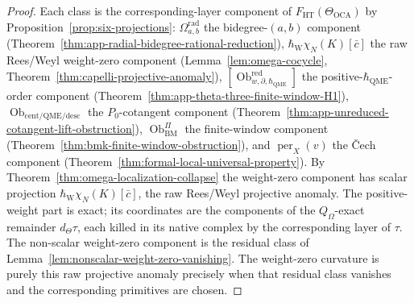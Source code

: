 \begin{proof}
Each class is the corresponding-layer component of
\(F_{\mathrm{HT}}(\Theta_{\mathrm{OCA}})\) by
Proposition~\ref{prop:six-projections}:
\(\Omega^{\mathrm{rad}}_{a,b}\) the bidegree-\((a,b)\) component
(Theorem~\ref{thm:app-radial-bidegree-rational-reduction}),
\(\hbar_{\mathrm{W}}\chi_N(K)[\bar c]\) the raw Rees/Weyl
weight-zero component
(Lemma~\ref{lem:omega-cocycle},
Theorem~\ref{thm:capelli-projective-anomaly}),
\([\operatorname{Ob}^{\mathrm{red}}_{w,\partial,\hbar_{\mathrm{QME}}}]\) the
positive-\(\hbar_{\mathrm{QME}}\)-order component
(Theorem~\ref{thm:app-theta-three-finite-window-H1}),
\(\operatorname{Ob}_{\mathrm{cent/QME/desc}}\) the \(P_0\)-cotangent
component (Theorem~\ref{thm:app-unreduced-cotangent-lift-obstruction}),
\(\operatorname{Ob}^{\Pi}_{\mathrm{BM}}\) the finite-window component
(Theorem~\ref{thm:bmk-finite-window-obstruction}), and
\(\operatorname{per}_X(v)\) the \v Cech component
(Theorem~\ref{thm:formal-local-universal-property}).  By
Theorem~\ref{thm:omega-localization-collapse} the weight-zero component
has scalar projection \(\hbar_{\mathrm{W}}\chi_N(K)[\bar c]\), the raw
Rees/Weyl projective anomaly.  The positive-weight part is exact; its coordinates
are the components of the \(Q_\Omega\)-exact remainder \(d_\Theta\tau\), each
killed in its native complex by the corresponding layer of \(\tau\).
The non-scalar weight-zero component is the residual class of
Lemma~\ref{lem:nonscalar-weight-zero-vanishing}.  The weight-zero
curvature is purely this raw projective anomaly precisely when that
residual class vanishes and the corresponding primitives are chosen.
\end{proof}

